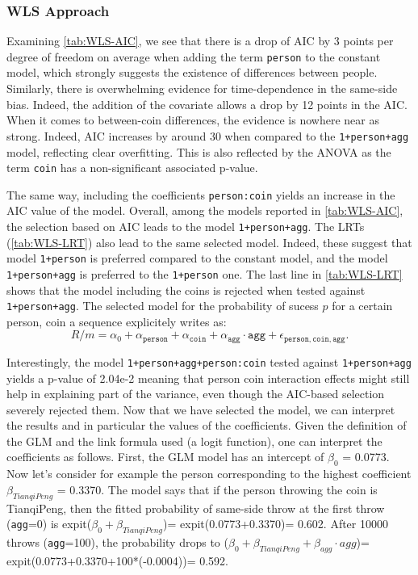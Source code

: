 \documentclass[a4paper, 12pt,oneside]{article}
\begin{document}
		\subsubsection{WLS Approach}
		Examining \ref{tab:WLS-AIC}, we see that there is a drop of AIC by 3 points per degree of freedom on average when adding the term \texttt{person} to the constant model, which strongly suggests the existence of differences between people. Similarly, there is overwhelming evidence for time-dependence in the same-side bias. Indeed, the addition of the  covariate allows a drop by 12 points in the AIC. When it comes to between-coin differences, the evidence is nowhere near as strong. Indeed, AIC increases by around 30 when compared to the \texttt{1+person+agg} model, reflecting clear overfitting. This is also reflected by the ANOVA as the term \texttt{coin} has a non-significant associated p-value.

		The same way, including the coefficients \texttt{person:coin} yields an increase in the AIC value of the model. 
		Overall, among the models reported in \ref{tab:WLS-AIC}, the selection based on AIC leads to the model \texttt{1+person+agg}. 
		The LRTs (\ref{tab:WLS-LRT}) also lead to the same selected model. Indeed, these suggest that model \texttt{1+person} is preferred compared to the constant model, and the model \texttt{1+person+agg} is preferred to the \texttt{1+person} one. The last line in \ref{tab:WLS-LRT} shows that the model including the coins is rejected when tested against \texttt{1+person+agg}. The selected model for the probability of sucess $p$ for a certain person, coin a sequence  explicitely writes as:  
		\begin{equation}
			\label{eq:wls_model}
			R/m = \alpha_0 + \alpha_{\texttt{person}}+\alpha_{\texttt{coin}} +\alpha_{\texttt{agg}}\cdot\texttt{agg} + \epsilon_{\texttt{person},\texttt{coin},\texttt{agg}}.
		\end{equation}   

		Interestingly, the model \texttt{1+person+agg+person:coin} tested against \texttt{1+person+agg} yields a p-value of 2.04e-2 meaning that person coin interaction effects might still help in explaining part of the variance, even though the AIC-based selection severely rejected them. 
		Now that we have selected the model, we can interpret the results and in particular the values of the coefficients. Given the definition of the GLM and the link formula used (a logit function), one can interpret the coefficients as follows. First, the GLM model has an intercept of $\beta_0$ = 0.0773. Now let's consider for example the person corresponding to the highest coefficient $\beta_{TianqiPeng}$ = 0.3370. The model says that if the  person throwing the coin is TianqiPeng, then the fitted probability of same-side throw at the first throw (\texttt{agg}=0) is expit($\beta_0+\beta_{TianqiPeng}$)= expit(0.0773+0.3370)= 0.602. After 10000 throws (\texttt{agg}=100), the probability drops to ($\beta_0+\beta_{TianqiPeng}+\beta_{agg}\cdot agg$)= expit(0.0773+0.3370+100*(-0.0004))= 0.592.
\end{document}
